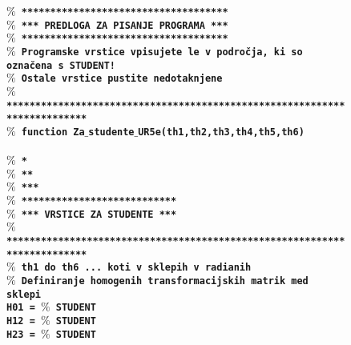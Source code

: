 \begin{figure}[h]
\scriptsize%
\textcolor[rgb]{0.13,0.55,0.13}{\textbf{\texttt{$\%$ ************************************}}}\\ %
\textcolor[rgb]{0.13,0.55,0.13}{\textbf{\texttt{$\%$ *** PREDLOGA ZA PISANJE PROGRAMA ***}}}\\ %
\textcolor[rgb]{0.13,0.55,0.13}{\textbf{\texttt{$\%$ ************************************}}}\\ %
\textcolor[rgb]{0.13,0.55,0.13}{\textbf{\texttt{$\%$ Programske vrstice vpisujete le v področja, ki so označena s STUDENT!}}}\\ %
\textcolor[rgb]{0.13,0.55,0.13}{\textbf{\texttt{$\%$ Ostale vrstice pustite nedotaknjene}}}\\ %
\textcolor[rgb]{0.13,0.55,0.13}{\textbf{\texttt{$\%$ *************************************************************************}}}\\ %
\textcolor[rgb]{0.00,0.00,0.00}{\textbf{\texttt{$\%$ function Za$\_$studente$\_$UR5e(th1,th2,th3,th4,th5,th6)}}}\\ %
\\ %
\textcolor[rgb]{0.13,0.55,0.13}{\textbf{\texttt{$\%$ *}}}\\ %
\textcolor[rgb]{0.13,0.55,0.13}{\textbf{\texttt{$\%$ **}}}\\ %
\textcolor[rgb]{0.13,0.55,0.13}{\textbf{\texttt{$\%$ ***}}}\\ %
\textcolor[rgb]{0.13,0.55,0.13}{\textbf{\texttt{$\%$ ***************************}}}\\ %
\textcolor[rgb]{0.13,0.55,0.13}{\textbf{\texttt{$\%$ *** VRSTICE ZA STUDENTE ***}}}\\ %
\textcolor[rgb]{0.13,0.55,0.13}{\textbf{\texttt{$\%$ *************************************************************************}}}\\ %
\textcolor[rgb]{0.13,0.55,0.13}{\textbf{\texttt{$\%$ th1 do th6 ... koti v sklepih v radianih}}}\\ %
\textcolor[rgb]{0.13,0.55,0.13}{\textbf{\texttt{$\%$ Definiranje homogenih transformacijskih matrik med sklepi}}}\\ %
\textbf{\texttt{\hspace*{1cm}H01 = \textcolor[rgb]{0.13,0.55,0.13}{$\%$ STUDENT}}}\\ %
\textbf{\texttt{\hspace*{1cm}H12 = \textcolor[rgb]{0.13,0.55,0.13}{$\%$ STUDENT}}}\\ %
\textbf{\texttt{\hspace*{1cm}H23 = \textcolor[rgb]{0.13,0.55,0.13}{$\%$ STUDENT}}}\\ %

\end{figure}
